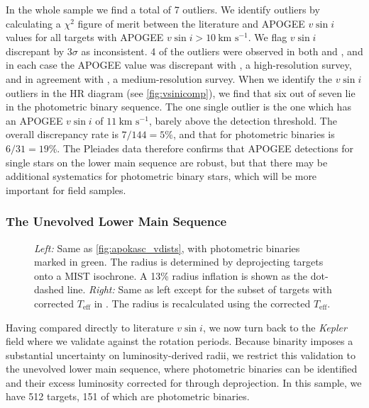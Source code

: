 \documentclass[preprint2]{aastex62}
\newcommand{\vsini}{\ensuremath{v \sin i}}
\newcommand{\Kepler}{\mbox{\textit{Kepler}}}
\newcommand{\Teff}{\ensuremath{T_{\textrm{eff}}}}
\newcommand{\kms}{\textrm{km~s}\ensuremath{^{-1}}}
\begin{document}
In the whole sample we find a total of 7 outliers. We
identify outliers by calculating a \(\chi^2\) figure of merit between the
literature and APOGEE \vsini{} values for all targets with APOGEE
\(\vsini > 10~\kms\). We flag \vsini{} discrepant by \(3\sigma\) as 
inconsistent. 4 of the outliers were observed in both \citet{Queloz98} and
\citet{Jackson18}, and in each case the APOGEE value was discrepant with
\citet{Queloz98}, a high-resolution survey, and in agreement with 
\citet{Jackson18}, a medium-resolution survey. When we identify the
\vsini{} outliers in the HR diagram (see \cref{fig:vsinicomp}), we find that 
    six out of seven lie in the
photometric binary sequence. The one single outlier is the one which has an
APOGEE \vsini{} of \(11~\kms\), barely above the detection threshold. The
overall discrepancy rate is \(7/144=5\%\), and that for
photometric binaries is \(6/31=19\%\). The Pleiades data therefore confirms
that APOGEE detections for single stars on the lower main sequence are robust,
but that there may be additional systematics for photometric binary stars, which
will be more important for field samples.

\subsubsection{The Unevolved Lower Main Sequence}
\label{sec:cooldwarfs}

\begin{figure}[htb]
  \centering
  \caption{\emph{Left:} Same as \cref{fig:apokasc_vdists}, with photometric 
      binaries marked in green. The radius is determined by deprojecting 
      targets onto a MIST isochrone. A 13\% radius inflation is shown as the 
      dot-dashed line. \emph{Right:} Same as left except for the subset of 
      targets with corrected \Teff{} in \citep{ElBadry18b}. The radius is 
      recalculated using the corrected 
  \Teff.\label{fig:cool_stars_velocity_radius}}
\end{figure}

Having compared directly to literature \vsini{}, we now turn back to the
\Kepler{} field where we validate against the \citet{McQuillan14} rotation
periods. Because binarity imposes a substantial uncertainty on
luminosity-derived radii, we restrict this validation to the unevolved lower
main sequence, where photometric binaries can be identified and their excess
luminosity corrected for through deprojection. In this sample, we have 512 
targets, 151 of which are photometric binaries. 
\end{document}
